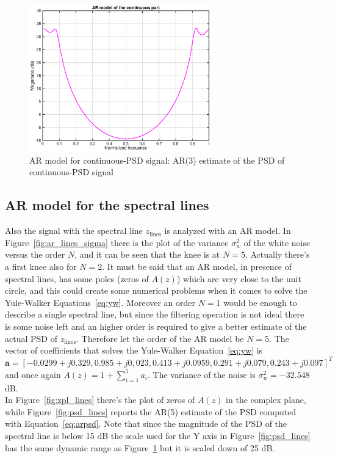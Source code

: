 \documentclass[10pt]{article}
\numberwithin{equation}{section}
\begin{document}
\begin{figure}[h!]
  \centering
  \includegraphics[width = 0.7\textwidth]{images/ar_continuous_psd}
  \caption{AR model for continuous-PSD signal: AR(3) estimate of the PSD of continuous-PSD signal}
  \label{fig:psd_cont}
\end{figure}


\subsection*{AR model for the spectral lines}
Also the signal with the spectral line $z_{\text{lines}}$ is analyzed with an AR model.
In Figure~\ref{fig:ar_lines_sigma} there is the plot of the variance $\sigma_w^2$ of the white noise versus the order $N$, and it can be seen that the knee is at $N=5$. Actually there's a first knee also for $N=2$. It must be said that an AR model, in presence of spectral lines, has some poles (zeros of $A(z)$) which are very close to the unit circle, and this could create some numerical problems when it comes to solve the Yule-Walker Equations~\ref{eq:yw}. Moreover an order $N=1$ would be enough to describe a single spectral line, but since the filtering operation is not ideal there is some noise left and an higher order is required to give a better estimate of the actual PSD of $z_{\text{lines}}$.
Therefore let the order of the AR model be $N=5$. The vector of coefficients that solves the Yule-Walker Equation~\ref{eq:yw} is $\mathbf{a} = [-0.0299 + j0.329, 0.985 + j0,023, 0.413 + j0.0959, 0.291 + j0.079, 0.243 + j0.097]^T$ and once again $A(z) = 1 + \sum_{i=1}^5a_i$. The variance of the noise is $\sigma_w^2 = -32.548$ dB. \\ %
In Figure~\ref{fig:zpl_lines} there's the plot of zeros of $A(z)$ in the complex plane, while Figure~\ref{fig:psd_lines} reports the AR(5) estimate of the PSD computed with Equation~\ref{eq:arpsd}. Note that since the magnitude of the PSD of the spectral line is below 15 dB the scale used for the Y axis in Figure~\ref{fig:psd_lines} has the same dynamic range as Figure~\ref{fig:psd_cont} but it is scaled down of 25 dB.
\end{document}
